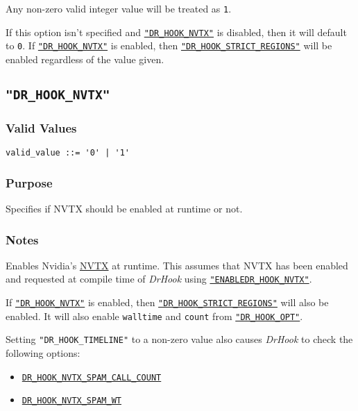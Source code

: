 Any non-zero valid integer value will be treated as \verb|1|.

If this option isn't specified and \hyperref[section:flags:DR_HOOK_NVTX]{\texttt{"DR\_HOOK\_NVTX"}} is disabled, then it will default to \verb|0|. If \hyperref[section:flags:DR_HOOK_NVTX]{\texttt{"DR\_HOOK\_NVTX"}} is enabled, then \hyperref[section:flags:DR_HOOK_STRICT_REGIONS]{\texttt{"DR\_HOOK\_STRICT\_REGIONS"}} will be enabled regardless of the value given.


\subsection{\texttt{"DR\_HOOK\_NVTX"}}
\label{section:flags:DR_HOOK_NVTX}
\vspace{-2ex}
\subsubsection{Valid Values}
\vspace{-2ex}
\verb+valid_value ::= '0' | '1'+ 

\vspace{-2ex}
\subsubsection{Purpose}
\vspace{-2ex}
Specifies if NVTX should be enabled at runtime or not.

\vspace{-2ex}
\subsubsection{Notes}
\vspace{-2ex}
Enables Nvidia's \href{https://github.com/NVIDIA/NVTX}{NVTX} at runtime. This assumes that NVTX has been enabled and requested at compile time of \textit{DrHook} using \hyperref[section:options:ENABLEDR_HOOK_NVTX]{\texttt{"ENABLEDR\_HOOK\_NVTX"}}.

If \hyperref[section:flags:DR_HOOK_NVTX]{\texttt{"DR\_HOOK\_NVTX"}} is enabled, then \hyperref[section:flags:DR_HOOK_STRICT_REGIONS]{\texttt{"DR\_HOOK\_STRICT\_REGIONS"}} will also be enabled. It will also enable \verb+walltime+ and \verb+count+ from \hyperref[section:flags:DR_HOOK_OPT]{\texttt{"DR\_HOOK\_OPT"}}.

Setting \texttt{"DR\_HOOK\_TIMELINE"} to a non-zero value also causes \textit{DrHook} to check the following options:
\begin{itemize}
    \item \hyperref[section:flags:DR_HOOK_NVTX_SPAM_CALL_COUNT]{\texttt{DR\_HOOK\_NVTX\_SPAM\_CALL\_COUNT}}
    \item \hyperref[section:flags:DR_HOOK_NVTX_SPAM_WT]{\texttt{DR\_HOOK\_NVTX\_SPAM\_WT}}
\end{itemize}

